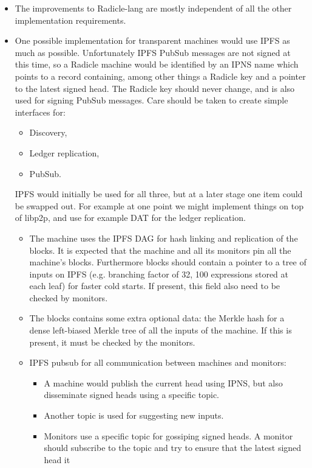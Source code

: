 \documentclass[a4paper, oneside, 10pt]{amsart}
\begin{document}
\begin{itemize}
\item
  The improvements to Radicle-lang are mostly independent of all the other
  implementation requirements.
\item
  One possible implementation for transparent machines would use IPFS as much as
  possible. Unfortunately IPFS PubSub messages are not signed at this time, so a
  Radicle machine would be identified by an IPNS name which points to a record
  containing, among other things a Radicle key and a pointer to the latest
  signed head. The Radicle key should never change, and is also used for signing
  PubSub messages. Care should be taken to create simple interfaces for:
  \begin{itemize}
  \item Discovery,
  \item Ledger replication,
  \item PubSub.
  \end{itemize}
  IPFS would initially be used for all three, but at a later stage one item
  could be swapped out. For example at one point we might implement things on
  top of libp2p, and use for example DAT for the ledger replication.
  \begin{itemize}
  \item
    The machine uses the IPFS DAG for hash linking and replication of the
    blocks. It is expected that the machine and all its monitors pin all the
    machine's blocks. Furthermore blocks should contain a pointer to a tree of
    inputs on IPFS (e.g. branching factor of 32, 100 expressions stored at each
    leaf) for faster cold starts. If present, this field also need to be checked
    by monitors.
  \item
    The blocks contains some extra optional data: the Merkle hash for a dense
    left-biased Merkle tree of all the inputs of the machine. If this is
    present, it must be checked by the monitors.
  \item
    IPFS pubsub for all communication between machines and monitors:
    \begin{itemize}
    \item
      A machine would publish the current head using IPNS, but also disseminate
      signed heads using a specific topic.
    \item
      Another topic is used for suggesting new inputs.
    \item
      Monitors use a specific topic for gossiping signed heads. A monitor should
      subscribe to the topic and try to ensure that the latest signed head it

\end{itemize}
\end{itemize}
\end{itemize}
\end{document}
